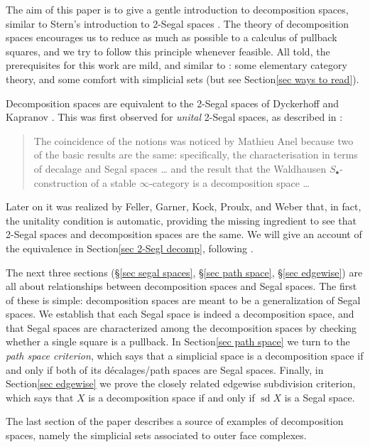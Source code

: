 \documentclass{conm-p-l}
\theoremstyle{definition}
\theoremstyle{remark}
\DeclareMathOperator{\sd}{sd}
\begin{document}
The aim of this paper is to give a gentle introduction to decomposition spaces, similar to Stern's introduction to 2-Segal spaces \cite{Stern:BIRS}.
The theory of decomposition spaces encourages us to reduce as much as possible to a calculus of pullback squares, and we try to follow this principle whenever feasible.
All told, the prerequisites for this work are mild, and similar to \cite{Stern:BIRS}: some elementary category theory, and some comfort with simplicial sets (but see Section\nobreakspace \ref {sec ways to read}).

Decomposition spaces are equivalent to the 2-Segal spaces of Dyckerhoff and Kapranov \cite{DyckerhoffKapranov:HSS}. 
This was first observed for \emph{unital} 2-Segal spaces, as described in \cite[p.~959]{GKT1}:

\begin{quote}
The coincidence of the notions was noticed by Mathieu Anel because two of the basic results are the same: specifically, the characterisation in terms of decalage and Segal spaces \dots{} and the result that the Waldhausen $S_\bullet$-construction of a stable $\infty$-category is a decomposition space \dots{}
\end{quote}
Later on it was realized by Feller, Garner, Kock, Proulx, and Weber \cite{Feller_et_al:E2SSU} that, in fact, the unitality condition is automatic, providing the missing ingredient to see that 2-Segal spaces and decomposition spaces are the same. 
We will give an account of the equivalence in Section\nobreakspace \ref {sec 2-Segl decomp}, following \cite{GKT1,Feller_et_al:E2SSU}.

The next three sections (\S\ref{sec segal spaces}, \S\ref{sec path space}, \S\ref{sec edgewise}) are all about relationships between decomposition spaces and Segal spaces.
The first of these is simple: decomposition spaces are meant to be a generalization of Segal spaces.
We establish that each Segal space is indeed a decomposition space, and that Segal spaces are characterized among the decomposition spaces by checking whether a single square is a pullback.
In Section\nobreakspace \ref {sec path space} we turn to the \emph{path space criterion}, which says that a simplicial space is a decomposition space if and only if both of its d\'ecalages/path spaces are Segal spaces.
Finally, in Section\nobreakspace \ref {sec edgewise} we prove the closely related edgewise subdivision criterion, which says that $X$ is a decomposition space if and only if $\sd X$ is a Segal space.

The last section of the paper describes a source of examples of decomposition spaces, namely the simplicial sets associated to outer face complexes.
\end{document}
